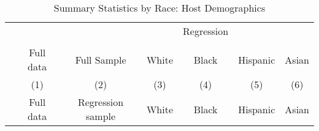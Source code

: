 {
	\def\sym#1{\ifmmode^{#1}\else\(^{#1}\)\fi}
	\begin{longtable}{l*{6}{c}}
		\caption{Summary Statistics by Race: Host Demographics}\\
		
		\hline
		&\multicolumn{1}{c}{}&\multicolumn{1}{c}{}&\multicolumn{1}{c}{}&\multicolumn{1}{c}{Regression}&\multicolumn{1}{c}{}&\multicolumn{1}{c}{}\\
		\cline{3-7}\\
			&\multicolumn{1}{c}{Full data}&\multicolumn{1}{c}{Full Sample}&\multicolumn{1}{c}{White}&\multicolumn{1}{c}{Black}&\multicolumn{1}{c}{Hispanic}&\multicolumn{1}{c}{Asian}\\
		
		\hline\hline\endfirsthead\hline\endhead\hline\endfoot\endlastfoot
		&\multicolumn{1}{c}{(1)}&\multicolumn{1}{c}{(2)}&\multicolumn{1}{c}{(3)}&\multicolumn{1}{c}{(4)}&\multicolumn{1}{c}{(5)}&\multicolumn{1}{c}{(6)}\\
		&\multicolumn{1}{c}{Full data}&\multicolumn{1}{c}{Regression sample}&\multicolumn{1}{c}{White}&\multicolumn{1}{c}{Black}&\multicolumn{1}{c}{Hispanic}&\multicolumn{1}{c}{Asian}\\
		\hline
		\endhead             
		     

\end{longtable}}
